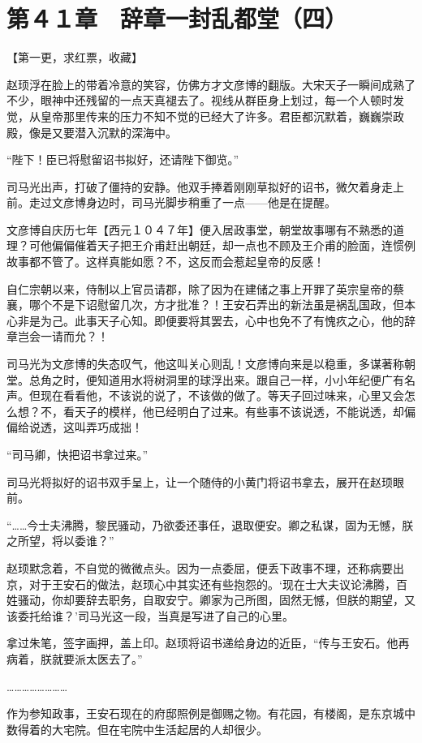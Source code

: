 \section{第４１章　辞章一封乱都堂（四）}

【第一更，求红票，收藏】

赵顼浮在脸上的带着冷意的笑容，仿佛方才文彦博的翻版。大宋天子一瞬间成熟了不少，眼神中还残留的一点天真褪去了。视线从群臣身上划过，每一个人顿时发觉，从皇帝那里传来的压力不知不觉的已经大了许多。君臣都沉默着，巍巍崇政殿，像是又要潜入沉默的深海中。

“陛下！臣已将慰留诏书拟好，还请陛下御览。”

司马光出声，打破了僵持的安静。他双手捧着刚刚草拟好的诏书，微欠着身走上前。走过文彦博身边时，司马光脚步稍重了一点——他是在提醒。

文彦博自庆历七年【西元１０４７年】便入居政事堂，朝堂故事哪有不熟悉的道理？可他偏偏催着天子把王介甫赶出朝廷，却一点也不顾及王介甫的脸面，连惯例故事都不管了。这样真能如愿？不，这反而会惹起皇帝的反感！

自仁宗朝以来，侍制以上官员请郡，除了因为在建储之事上开罪了英宗皇帝的蔡襄，哪个不是下诏慰留几次，方才批准？！王安石弄出的新法虽是祸乱国政，但本心非是为己。此事天子心知。即便要将其罢去，心中也免不了有愧疚之心，他的辞章岂会一请而允？！

司马光为文彦博的失态叹气，他这叫关心则乱！文彦博向来是以稳重，多谋著称朝堂。总角之时，便知道用水将树洞里的球浮出来。跟自己一样，小小年纪便广有名声。但现在看看他，不该说的说了，不该做的做了。等天子回过味来，心里又会怎么想？不，看天子的模样，他已经明白了过来。有些事不该说透，不能说透，却偏偏给说透，这叫弄巧成拙！

“司马卿，快把诏书拿过来。”

司马光将拟好的诏书双手呈上，让一个随侍的小黄门将诏书拿去，展开在赵顼眼前。

“……今士夫沸腾，黎民骚动，乃欲委还事任，退取便安。卿之私谋，固为无憾，朕之所望，将以委谁？”

赵顼默念着，不自觉的微微点头。因为一点委屈，便丢下政事不理，还称病要出京，对于王安石的做法，赵顼心中其实还有些抱怨的。‘现在士大夫议论沸腾，百姓骚动，你却要辞去职务，自取安宁。卿家为己所图，固然无憾，但朕的期望，又该委托给谁？’司马光这一段，当真是写进了自己的心里。

拿过朱笔，签字画押，盖上印。赵顼将诏书递给身边的近臣，“传与王安石。他再病着，朕就要派太医去了。”

……………………

作为参知政事，王安石现在的府邸照例是御赐之物。有花园，有楼阁，是东京城中数得着的大宅院。但在宅院中生活起居的人却很少。

